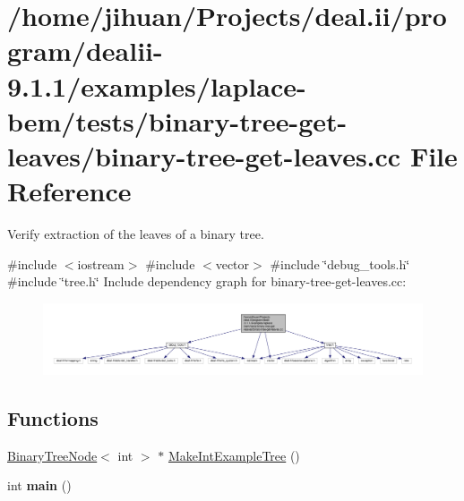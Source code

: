 \hypertarget{binary-tree-get-leaves_8cc}{}\section{/home/jihuan/\+Projects/deal.ii/program/dealii-\/9.1.1/examples/laplace-\/bem/tests/binary-\/tree-\/get-\/leaves/binary-\/tree-\/get-\/leaves.cc File Reference}
\label{binary-tree-get-leaves_8cc}


Verify extraction of the leaves of a binary tree.  


{\ttfamily \#include $<$iostream$>$}\newline
{\ttfamily \#include $<$vector$>$}\newline
{\ttfamily \#include \char`\"{}debug\+\_\+tools.\+h\char`\"{}}\newline
{\ttfamily \#include \char`\"{}tree.\+h\char`\"{}}\newline
Include dependency graph for binary-\/tree-\/get-\/leaves.cc\+:\nopagebreak
\begin{figure}[H]
\begin{center}
\leavevmode
\includegraphics[width=350pt]{binary-tree-get-leaves_8cc__incl}
\end{center}
\end{figure}
\subsection*{Functions}
\begin{DoxyCompactItemize}
\item 
\hyperlink{classBinaryTreeNode}{Binary\+Tree\+Node}$<$ int $>$ $\ast$ \hyperlink{binary-tree-get-leaves_8cc_ac883754e3b5ec7169c6d767f15641276}{Make\+Int\+Example\+Tree} ()
\item 
\mbox{\label{binary-tree-get-leaves_8cc_ae66f6b31b5ad750f1fe042a706a4e3d4}} 
int {\bfseries main} ()
\end{DoxyCompactItemize}


